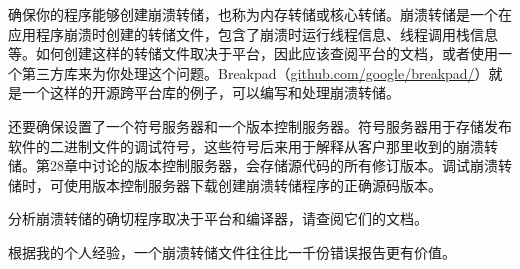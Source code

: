 
确保你的程序能够创建崩溃转储，也称为内存转储或核心转储。崩溃转储是一个在应用程序崩溃时创建的转储文件，包含了崩溃时运行线程信息、线程调用栈信息等。如何创建这样的转储文件取决于平台，因此应该查阅平台的文档，或者使用一个第三方库来为你处理这个问题。Breakpad（\url{github.com/google/breakpad/}）就是一个这样的开源跨平台库的例子，可以编写和处理崩溃转储。

还要确保设置了一个符号服务器和一个版本控制服务器。符号服务器用于存储发布软件的二进制文件的调试符号，这些符号后来用于解释从客户那里收到的崩溃转储。第28章中讨论的版本控制服务器，会存储源代码的所有修订版本。调试崩溃转储时，可使用版本控制服务器下载创建崩溃转储程序的正确源码版本。

分析崩溃转储的确切程序取决于平台和编译器，请查阅它们的文档。

根据我的个人经验，一个崩溃转储文件往往比一千份错误报告更有价值。


















